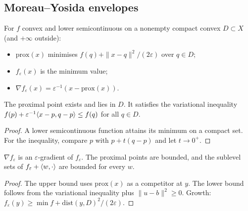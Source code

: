 \subsection{Moreau--Yosida envelopes}

\begin{definition}
  \label{def:myEnv}
  \leanok
  For $f$ convex and lower semicontinuous on a nonempty compact convex $D\subset X$ (and $+\infty$ outside):
  \begin{itemize}
    \item $\mathrm{prox}(x)$ minimises $f(q)+\|x-q\|^2/(2\varepsilon)$ over $q\in D$;
    \item $f_\varepsilon(x)$ is the minimum value;
    \item $\nabla f_\varepsilon(x)=\varepsilon^{-1}(x-\mathrm{prox}(x))$.
  \end{itemize}
\end{definition}

\begin{lemma}
  \label{lem:prox}
  \leanok
  The proximal point exists and lies in $D$. It satisfies the variational inequality
  $f(p)+\varepsilon^{-1}\langle x-p, q-p\rangle\le f(q)$ for all $q\in D$.
\end{lemma}
\begin{proof}
  \leanok
  A lower semicontinuous function attains its minimum on a compact set. For the inequality, compare $p$ with
  $p+t(q-p)$ and let $t\to0^+$.
\end{proof}

\begin{theorem}
  \label{thm:isMYSmooth_myEnv}
  \leanok
  $\nabla f_\varepsilon$ is an $\varepsilon$-gradient of $f_\varepsilon$. The proximal points are bounded,
  and the sublevel sets of $f_\varepsilon+\langle w, \cdot\rangle$ are bounded for every $w$.
\end{theorem}
\begin{proof}
  \leanok
  The upper bound uses $\mathrm{prox}(x)$ as a competitor at $y$. The lower bound follows from the
  variational inequality plus $\|u-b\|^2\ge0$. Growth: $f_\varepsilon(y)\ge\min f+\mathrm{dist}(y,D)^2/(2\varepsilon)$.
\end{proof}

